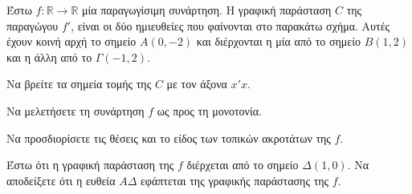 Έστω $f: \mathbb{R} \rightarrow \mathbb{R}$ μία παραγωγίσιμη συνάρτηση. Η γραφική παράσταση $C$ της παραγώγου $f'$, είναι οι δύο ημιευθείες που φαίνονται στο παρακάτω σχήμα. Αυτές έχουν κοινή αρχή το σημείο $A(0, -2)$ και διέρχονται η μία από το σημείο $B(1, 2)$ και η άλλη από το $\Gamma(-1, 2)$.
\begin{alist}
    \item Να βρείτε τα σημεία τομής της $C$ με τον άξονα $x'x$. 
    \item Να μελετήσετε τη συνάρτηση $f$ ως προς τη μονοτονία. 
    \item Να προσδιορίσετε τις θέσεις και το είδος των τοπικών ακροτάτων της $f$. 
    \item Έστω ότι η γραφική παράσταση της $f$ διέρχεται από το σημείο $\Delta(1,0)$. Να αποδείξετε ότι η ευθεία $A\Delta$ εφάπτεται της γραφικής παράστασης της $f$. 
\end{alist}